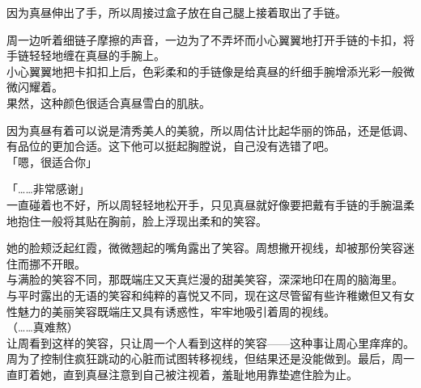 因为真昼伸出了手，所以周接过盒子放在自己腿上接着取出了手链。

周一边听着细链子摩擦的声音，一边为了不弄坏而小心翼翼地打开手链的卡扣，将手链轻轻地缠在真昼的手腕上。\\

小心翼翼地把卡扣扣上后，色彩柔和的手链像是给真昼的纤细手腕增添光彩一般微微闪耀着。\\

果然，这种颜色很适合真昼雪白的肌肤。

因为真昼有着可以说是清秀美人的美貌，所以周估计比起华丽的饰品，还是低调、有品位的更加合适。这下他可以挺起胸膛说，自己没有选错了吧。\\

「嗯，很适合你」

「……非常感谢」\\

一直碰着也不好，所以周轻轻地松开手，只见真昼就好像要把戴有手链的手腕温柔地抱住一般将其贴在胸前，脸上浮现出柔和的笑容。

她的脸颊泛起红霞，微微翘起的嘴角露出了笑容。周想撇开视线，却被那份笑容迷住而挪不开眼。\\

与满脸的笑容不同，那既端庄又天真烂漫的甜美笑容，深深地印在周的脑海里。\\

与平时露出的无语的笑容和纯粹的喜悦又不同，现在这尽管留有些许稚嫩但又有女性魅力的美丽笑容既端庄又具有诱惑性，牢牢地吸引着周的视线。\\

（……真难熬）\\

让周看到这样的笑容，只让周一个人看到这样的笑容——这种事让周心里痒痒的。\\

周为了控制住疯狂跳动的心脏而试图转移视线，但结果还是没能做到。最后，周一直盯着她，直到真昼注意到自己被注视着，羞耻地用靠垫遮住脸为止。
